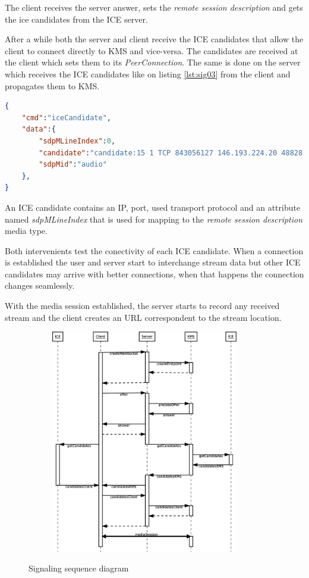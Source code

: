 The client receives the server answer, sets the \emph{remote session description} and gets the ice candidates from the \ac{ICE} server. 

After a while both the server and client receive the \ac{ICE} candidates that allow the client to connect directly to \ac{KMS} and vice-versa. The candidates are received at the client which sets them to its \emph{PeerConnection}. The same is done on the server which receives the \ac{ICE} candidates like on listing \ref{lst:sig03} from the client and propagates them to \ac{KMS}.

\begin{minipage}{\linewidth}
\begin{lstlisting}[caption={ICE candidates sent by KMS and client},label={lst:sig03},language=json]
{
	"cmd":"iceCandidate",
	"data":{
		"sdpMLineIndex":0,
		"candidate":"candidate:15 1 TCP 843056127 146.193.224.20 48828 typ srflx raddr 192.168.1.105 rport 48828 tcptype passive",
		"sdpMid":"audio"
	},
}
\end{lstlisting}
\end{minipage}

An \ac{ICE} candidate contains an \ac{IP}, port, used transport protocol and an attribute named \emph{sdpMLineIndex} that is used for mapping to the \emph{remote session description} media type.

Both intervenients test the conectivity of each \ac{ICE} candidate. When a connection is established the user and server start to interchange stream data but other \ac{ICE} candidates may arrive with better connections, when that happens the connection changes seamlessly. 

With the media session established, the server starts to record any received stream and the client creates an \ac{URL} correspondent to the stream location.

\begin{figure}[!htb]
    \centering
    \begin{subfigure}{}
    	\includegraphics[width=0.9\textwidth]{figures/signaling}
    \end{subfigure}
    \caption{Signaling sequence diagram}
\end{figure} 
